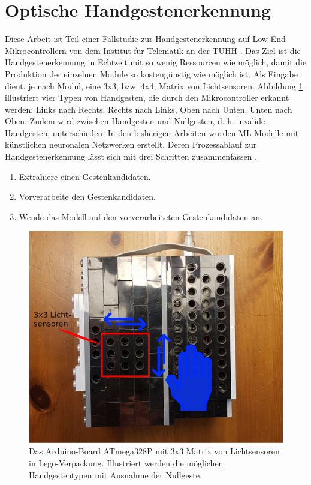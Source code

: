 \section{Optische Handgestenerkennung}
\label{sec:fallstudie}
Diese Arbeit ist Teil einer Fallstudie zur Handgestenerkennung auf Low-End Mikrocontrollern von dem Institut für Telematik an der TUHH \cite{venzkeArticle}. Das Ziel ist die Handgestenerkennung in Echtzeit mit so wenig
Ressourcen wie möglich, damit die Produktion der einzelnen Module so kostengünstig wie möglich ist. Als Eingabe dient, je nach Modul, eine 3x3, bzw. 4x4, Matrix von Lichtsensoren. Abbildung \ref{fig:arduino_ex}
illustriert vier Typen von Handgesten, die durch den Mikrocontroller erkannt werden: Links nach Rechts, Rechts nach Links, Oben nach Unten, Unten nach Oben. Zudem wird zwischen Handgesten und Nullgesten, d. h.
invalide Handgesten, unterschieden. In den bisherigen Arbeiten wurden ML Modelle mit künstlichen neuronalen Netzwerken erstellt. Deren Prozessablauf zur Handgestenerkennung lässt sich mit drei
Schritten zusammenfassen \cite{venzkeArticle}.
\begin{enumerate}
    \item Extrahiere einen Gestenkandidaten.
    \item Vorverarbeite den Gestenkandidaten.
    \item Wende das Modell auf den vorverarbeiteten Gestenkandidaten an.
\end{enumerate}
\begin{figure}
    \centering
    \includegraphics[width=0.6\linewidth]{images/arduino_ex.png}
    \caption{Das Arduino-Board ATmega328P mit 3x3 Matrix von Lichtsensoren in Lego-Verpackung. Illustriert werden die möglichen Handgestentypen mit Ausnahme der Nullgeste.}
    \label{fig:arduino_ex}
\end{figure}





